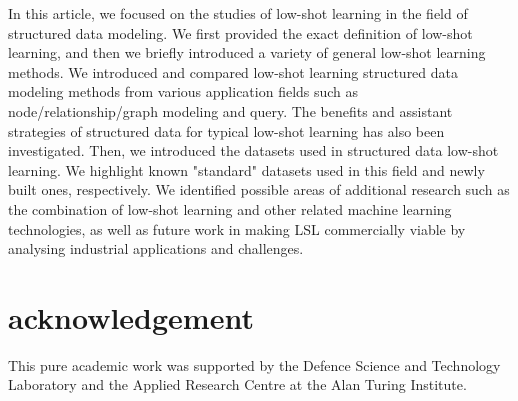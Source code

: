 \label{sec8}
In this article, we  focused on the studies of low-shot learning in the field of structured data modeling. We first provided the exact definition of low-shot learning, and then we briefly introduced a variety of general low-shot learning methods. We introduced and compared low-shot learning structured data modeling methods from various application fields such as node/relationship/graph modeling and query. The benefits and assistant strategies of structured data for typical low-shot learning has also been investigated. Then, we introduced the datasets used in structured data low-shot learning. We highlight known "standard" datasets used in this field and newly built ones, respectively. We identified possible areas of additional research such as the combination of low-shot learning and other related machine learning technologies, as well as future work in making LSL commercially viable by analysing industrial applications and challenges.
\section*{acknowledgement}
\label{sec9}
This pure academic work was supported by the Defence Science and Technology Laboratory and the Applied Research Centre at the Alan Turing Institute.



\endinput